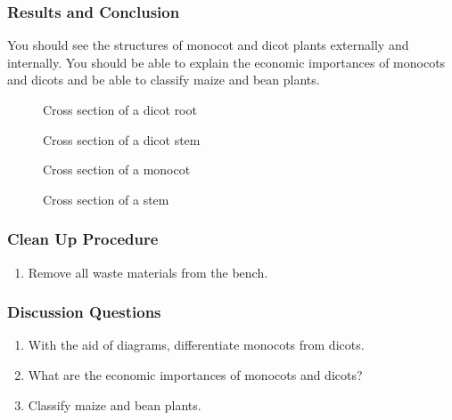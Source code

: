 \subsubsection*{Results and Conclusion}
You should see the structures of monocot and dicot plants externally and internally. You should be able to explain the economic importances of monocots and dicots and be able to classify maize and bean plants.

\begin{figure}[h]
\begin{center}
\def\svgwidth{6cm}

\caption{Cross section of a dicot root}
\label{fig:diroot}
\end{center}
\end{figure}

\begin{figure}[h]
\begin{center}
\def\svgwidth{6cm}

\caption{Cross section of a dicot stem}
\label{fig:fish}
\end{center}
\end{figure}

\begin{figure}[h]
\begin{center}
\def\svgwidth{6cm}

\caption{Cross section of a monocot}
\label{fig:monoroot}
\end{center}
\end{figure}

\begin{figure}[h]
\begin{center}
\def\svgwidth{6cm}

\caption{Cross section of a stem}
\label{fig:monostem}
\end{center}
\end{figure}

\subsubsection*{Clean Up Procedure}
\begin{enumerate}
\item{Remove all waste materials from the bench.}
\end{enumerate}

\subsubsection*{Discussion Questions}
\begin{enumerate}
\item{With the aid of diagrams, differentiate monocots from dicots.}
\item{What are the economic importances of monocots and dicots?}
\item{Classify maize and bean plants.}
\end{enumerate}



